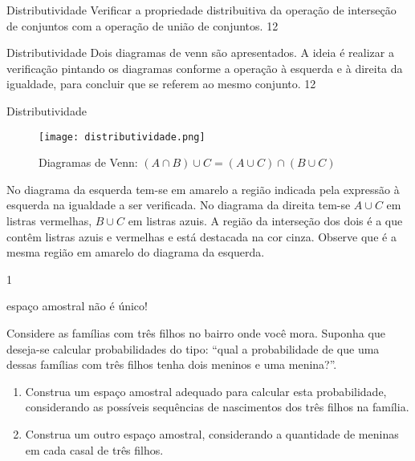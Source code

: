 \begin{objectives}{Distributividade}
{
Verificar a propriedade distribuitiva da operação de interseção de conjuntos com a operação de união de conjuntos.
}{1}{2}
\end{objectives}
\begin{sugestions}{Distributividade}
{
Dois diagramas de venn são apresentados. A ideia é realizar a verificação pintando os diagramas conforme a operação à esquerda e à direita da igualdade, para concluir que se referem ao mesmo conjunto.
}{1}{2}
\end{sugestions}
\begin{answer}{Distributividade}
{
\begin{figure}[H]
\centering

\texttt{[image: distributividade.png]}
\caption{Diagramas de Venn: $(A\cap B)\cup C=(A\cup C)\cap(B\cup C)$}
\label{}
\end{figure}

No diagrama da esquerda tem-se em amarelo a região indicada pela expressão à esquerda na igualdade a ser verificada. No diagrama da direita tem-se $A\cup C$ em listras vermelhas, $B\cup C$ em listras azuis. A região da interseção dos dois é a que contêm listras azuis e vermelhas e está destacada na cor cinza. Observe que é a mesma região em amarelo do diagrama da esquerda.
}{1}
\end{answer}
\begin{task}{espaço amostral não é único!}
\label{espaço-nao-unico}


Considere as famílias com três filhos no bairro onde você mora. Suponha que deseja-se calcular probabilidades do tipo: “qual a probabilidade de que uma dessas famílias com três filhos tenha dois meninos e uma menina?”.
\begin{enumerate}
\item {} 
Construa um espaço amostral adequado para calcular esta probabilidade, considerando as possíveis sequências de nascimentos dos três filhos na família.

\item {} 
Construa um outro espaço amostral, considerando a quantidade de meninas em cada casal de três filhos.

\end{enumerate}
\end{task}

